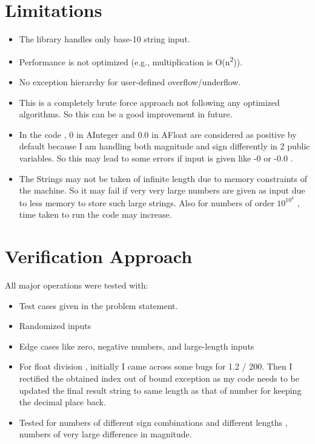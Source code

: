 \documentclass{article}
\begin{document}
\section{Limitations}
\begin{itemize}
  \item The library handles only base-10 string input.
  \item Performance is not optimized (e.g., multiplication is O(n\textsuperscript{2})).
  \item No exception hierarchy for user-defined overflow/underflow.
  \item This is a completely brute force approach not following any optimized algorithms. So this can be a good improvement in future.
  \item In the code , 0 in AInteger and 0.0 in AFloat are considered as positive by default because I am handling both magnitude and sign differently in 2 public variables. So this may lead to some errors if input is given like -0 or -0.0 .
  \item The Strings may not be taken of infinite length due to memory constraints of the machine. So it may fail if very very large numbers are given as input due to less memory to store such large strings. Also for numbers of order $10^{{10}^{8}}$ , time taken to run the code may increase.
  
\end{itemize}

\section{Verification Approach}
All major operations were tested with:
\begin{itemize}
  \item Test cases given in the problem statement. 
  \item Randomized inputs
  \item Edge cases like zero, negative numbers, and large-length inputs
  \item For float division , initially I came across some bugs for 1.2 / 200. Then I rectified the obtained index out of bound exception as my code needs to be updated the final result string to same length as that of number for keeping the decimal place back. 
  \item Tested for numbers of different sign combinations and different lengths , numbers of very large difference in magnitude.
  
\end{itemize}
\end{document}
